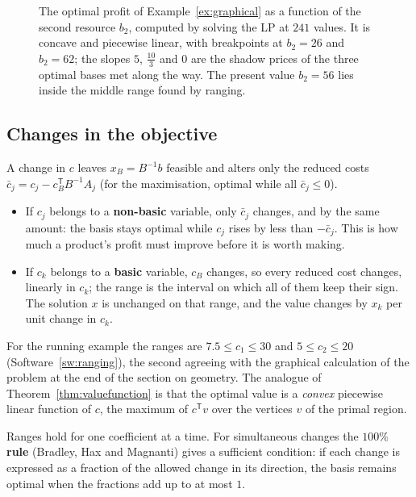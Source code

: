 \documentclass[11pt,a4paper]{article}
\numberwithin{equation}{section}
\theoremstyle{definition}
\begin{document}
\begin{figure}[H]
\caption{The optimal profit of Example~\ref{ex:graphical} as a function of the second resource $b_2$, computed by solving the LP at $241$ values. It is concave and piecewise linear, with breakpoints at $b_2 = 26$ and $b_2 = 62$; the slopes $5$, $\frac{10}3$ and $0$ are the shadow prices of the three optimal bases met
along the way. The present value $b_2 = 56$ lies inside the middle range found by ranging.}
\label{fig:parametric}
\end{figure}

\subsection{Changes in the objective}
\label{ssec:costranging}

A change in $c$ leaves $x_B = B^{-1}b$ feasible and alters only the reduced costs $\bar c_j = c_j - c_B^{\mathsf T}B^{-1}A_j$ (for the maximisation, optimal while all $\bar c_j \leq 0$).
\begin{itemize}
\item If $c_j$ belongs to a \textbf{non-basic} variable, only $\bar c_j$ changes, and by the same amount: the basis stays optimal while $c_j$ rises by less than $-\bar c_j$. This is how much a product's profit must improve before it is worth making.
\item If $c_k$ belongs to a \textbf{basic} variable, $c_B$ changes, so every reduced cost changes, linearly in $c_k$; the range is the interval on which all of them keep their sign. The solution $x$ is unchanged on that range, and the value changes by $x_k$ per unit change in $c_k$.
\end{itemize}
For the running example the ranges are $7.5 \leq c_1 \leq 30$ and $5 \leq c_2 \leq 20$ (Software~\ref{sw:ranging}), the second agreeing with the graphical calculation of the problem at the end of the section on geometry. The analogue of Theorem~\ref{thm:valuefunction} is that the optimal value is a \emph{convex} piecewise linear function of $c$, the maximum of
$c^{\mathsf T}v$ over the vertices $v$ of the primal region.

Ranges hold for one coefficient at a time. For simultaneous changes the \textbf{$100\%$ rule} (Bradley, Hax and Magnanti) gives a sufficient condition: if each change is expressed as a fraction of the allowed change in its direction, the basis remains optimal when the fractions add up to at most $1$.
\end{document}
